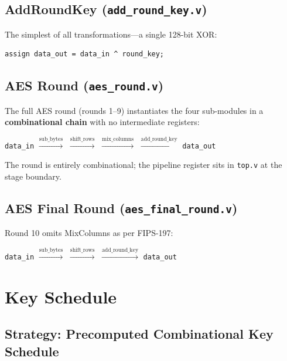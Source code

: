 \documentclass[12pt,a4paper]{article}
\begin{document}
\subsection{AddRoundKey (\texttt{add\_round\_key.v})}

The simplest of all transformations---a single 128-bit XOR:

\begin{lstlisting}[caption={AddRoundKey implementation}]
assign data_out = data_in ^ round_key;
\end{lstlisting}

\subsection{AES Round (\texttt{aes\_round.v})}

The full AES round (rounds 1--9) instantiates the four sub-modules in a
\textbf{combinational chain} with no intermediate registers:

\begin{center}
\texttt{data\_in}
$\xrightarrow{\text{sub\_bytes}}$
$\xrightarrow{\text{shift\_rows}}$
$\xrightarrow{\text{mix\_columns}}$
$\xrightarrow{\text{add\_round\_key}}$
\texttt{data\_out}
\end{center}

The round is entirely combinational; the pipeline register sits in
\texttt{top.v} at the stage boundary.

\subsection{AES Final Round (\texttt{aes\_final\_round.v})}

Round 10 omits MixColumns as per FIPS-197:

\begin{center}
\texttt{data\_in}
$\xrightarrow{\text{sub\_bytes}}$
$\xrightarrow{\text{shift\_rows}}$
$\xrightarrow{\text{add\_round\_key}}$
\texttt{data\_out}
\end{center}

\section{Key Schedule}

\subsection{Strategy: Precomputed Combinational Key Schedule}
\end{document}
